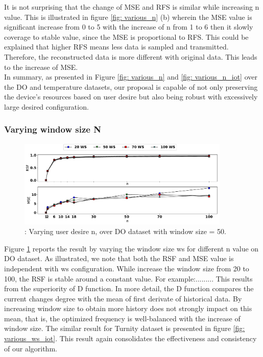 It is not surprising that the change of MSE and RFS is similar while increasing n value. This is illustrated in figure \ref{fig: various_n} (b) wherein the MSE value is significant increase from 0 to 5 with the increase of n from 1 to 6 then it slowly coverage to stable value, since the MSE is proportional to RFS. This could be explained that higher RFS means less data is sampled and transmitted. Therefore, the reconstructed data is more different with original data. This leads to the increase of MSE. \\
In summary, as presented in Figure \ref{fig: various_n} and \ref{fig: various_n_iot} over the DO and temperature datasets, our proposal is capable of not only preserving the device's resources based on user desire but also being robust with excessively large desired configuration. 

\subsubsection{Varying window size N}

\begin{figure}[h]
	\centering
	\includegraphics[width=0.9\textwidth]{Part3/Chapter8/figures/result_various_windowsize.pdf}
	\caption{ : Varying user desire n, over DO dataset with window size = 50.}
	\label{fig: various_ws}
\end{figure}

Figure \ref{fig: various_ws} reports the result by varying the window size ws for different n value on DO dataset. As illustrated, we note that both the RSF and MSE value is independent with ws configuration. While increase the window size from 20 to 100, the RSF is stable around a constant value. For example:......... This results from the superiority of D function. In more detail, the D function compares the current changes degree with the mean of first derivate of historical data. By increasing window size to obtain more history does not strongly impact on this mean, that is, the optimized frequency is well-balanced with the increase of window size. The similar result for Turnity dataset is presented in figure \ref{fig: various_ws_iot}. This result again consolidates the effectiveness and consistency of our algorithm.

